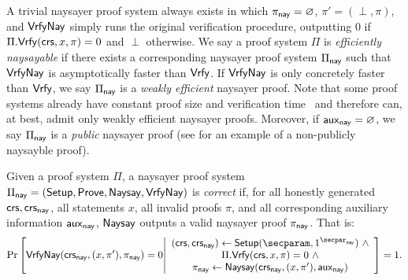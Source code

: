 A trivial naysayer proof system always exists in which $\pi_{\mathsf{nay}} = \varnothing$, $\pi' = (\perp, \pi)$, and ${\mathsf{Vrfy}}\mathsf{Nay}$ simply runs the original verification procedure, outputting $0$ if $\Pi.\mathsf{Vrfy}(\mathsf{crs}, x, \pi) = 0$ and $\perp$ otherwise.
We say a proof system $\Pi$ is \emph{efficiently naysayable} if there exists a corresponding naysayer proof system $\Pi_{\mathsf{nay}}$ such that ${\mathsf{Vrfy}}\mathsf{Nay}$ is asymptotically faster than $\mathsf{Vrfy}$. If ${\mathsf{Vrfy}}\mathsf{Nay}$ is only concretely faster than $\mathsf{Vrfy}$, we say $\Pi_{\mathsf{nay}}$ is a \emph{weakly efficient} naysayer proof. Note that some proof systems already have constant proof size and verification time~\cite{EC:Groth16,C:Schnorr89} and therefore can, at best, admit only weakly efficient naysayer proofs. 
Moreover, if $\mathsf{aux}_{\mathsf{nay}} = \varnothing$, we say $\Pi_{\mathsf{nay}}$ is a \emph{public} naysayer proof (see  for an example of a non-publicly naysayble proof). 

\begin{definition}
    Given a proof system $\Pi$, a naysayer proof system $\Pi_{\mathsf{nay}} = (\mathsf{Setup}, \mathsf{Prove}, \mathsf{Naysay}, {\mathsf{Vrfy}}\mathsf{Nay})$ is \emph{correct} if, for all honestly generated $\mathsf{crs}, \mathsf{crs}_{\mathsf{nay}}$, all statements $x$, all invalid proofs $\pi$, and all corresponding auxiliary information $\mathsf{aux}_{\mathsf{nay}}$, $\mathsf{Naysay}$ outputs a valid naysayer proof $\pi_{\mathsf{nay}}$. That is:
\begin{equation*}
    \Pr\left[
        \vrfynay(\crs_{\nay}, (x,\pi'), \pi_{\nay})=0 
        \middle| 
        \begin{array}{c}
            (\crs, \crs_{\nay}) \gets \setup(\secparam, 1^{\naysecparam})~\land\\
            \Pi.\vrfy(\crs, x,\pi)=0~\land\\
            \pi_{\nay} \gets \naysay(\crs_{\nay}, (x, \pi'), \aux_{\nay})
        \end{array}
    \right] = 1.
\end{equation*}
\end{definition}

